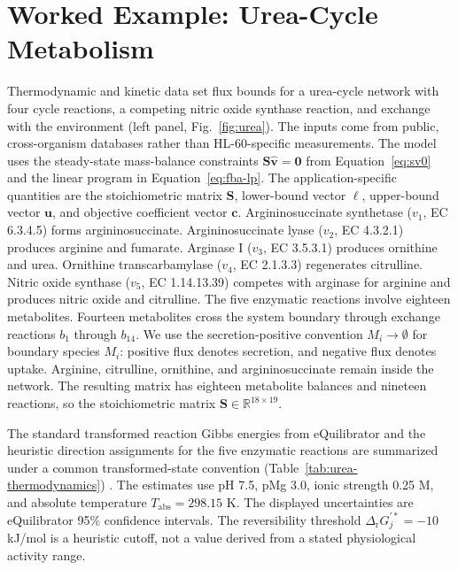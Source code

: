 \section{Worked Example: Urea-Cycle Metabolism}\label{sec:urea}

Thermodynamic and kinetic data set flux bounds for a urea-cycle network with
four cycle reactions, a competing nitric oxide
synthase reaction, and exchange with the environment (left panel,
Fig.~\ref{fig:urea}). The inputs come from public, cross-organism
databases rather than HL-60-specific measurements. The model uses the
steady-state mass-balance constraints $\mathbf S\hat{\mathbf v}=\mathbf 0$ from
Equation~\eqref{eq:sv0} and the linear program in
Equation~\eqref{eq:fba-lp}. The application-specific quantities are
the stoichiometric matrix $\mathbf S$, lower-bound vector $\boldsymbol\ell$,
upper-bound vector $\mathbf u$, and objective coefficient vector $\mathbf c$.
Argininosuccinate synthetase ($v_1$, EC 6.3.4.5)
forms argininosuccinate. Argininosuccinate lyase ($v_2$, EC 4.3.2.1)
produces arginine and fumarate. Arginase I ($v_3$, EC 3.5.3.1) produces
ornithine and urea. Ornithine transcarbamylase ($v_4$, EC 2.1.3.3)
regenerates citrulline. Nitric oxide synthase ($v_5$, EC 1.14.13.39)
competes with arginase for arginine and produces nitric oxide and
citrulline. The five enzymatic reactions involve eighteen metabolites. Fourteen
metabolites cross the system boundary through exchange reactions $b_1$
through $b_{14}$. We use the secretion-positive convention
$M_i\to\emptyset$ for boundary species $M_i$: positive flux denotes
secretion, and negative flux denotes
uptake. Arginine, citrulline, ornithine, and argininosuccinate remain inside
the network. The resulting matrix has eighteen metabolite balances and
nineteen reactions, so the stoichiometric matrix
$\mathbf S\in\mathbb R^{18\times19}$.

The standard transformed reaction Gibbs energies from eQuilibrator and the
heuristic direction assignments for the five enzymatic reactions are
summarized under a common transformed-state convention
(Table~\ref{tab:urea-thermodynamics}) \cite{Noor2013,Beber2022}. The estimates
use pH 7.5, pMg 3.0, ionic strength 0.25 M, and absolute temperature
$T_{\mathrm{abs}}=298.15$ K. The displayed uncertainties are eQuilibrator
95\% confidence intervals. The reversibility threshold
$\Delta_{\mathrm r}G_j^{\prime *}=-10$ kJ/mol is a heuristic cutoff, not a
value derived from a stated physiological activity range.

